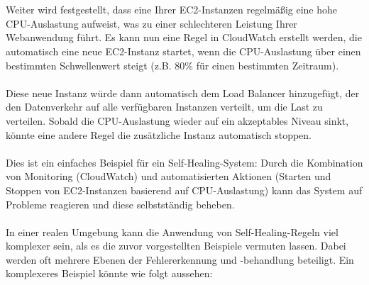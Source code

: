 \\\\
Weiter wird festgestellt, dass eine Ihrer EC2-Instanzen regelmäßig eine hohe CPU-Auslastung aufweist, was zu einer schlechteren Leistung Ihrer Webanwendung führt. Es kann nun eine Regel in CloudWatch erstellt werden, die automatisch eine neue EC2-Instanz startet, wenn die CPU-Auslastung über einen bestimmten Schwellenwert steigt (z.B. 80\% für einen bestimmten Zeitraum).
\\\\
Diese neue Instanz würde dann automatisch dem Load Balancer hinzugefügt, der den Datenverkehr auf alle verfügbaren Instanzen verteilt, um die Last zu verteilen. Sobald die CPU-Auslastung wieder auf ein akzeptables Niveau sinkt, könnte eine andere Regel die zusätzliche Instanz automatisch stoppen.
\\\\
Dies ist ein einfaches Beispiel für ein Self-Healing-System: Durch die Kombination von Monitoring (CloudWatch) und automatisierten Aktionen (Starten und Stoppen von EC2-Instanzen basierend auf CPU-Auslastung) kann das System auf Probleme reagieren und diese selbstständig beheben.
\\\\
In einer realen Umgebung kann die Anwendung von Self-Healing-Regeln viel komplexer sein, als es die zuvor vorgestellten Beispiele vermuten lassen. Dabei werden oft mehrere Ebenen der Fehlererkennung und -behandlung beteiligt. Ein komplexeres Beispiel könnte wie folgt aussehen:

